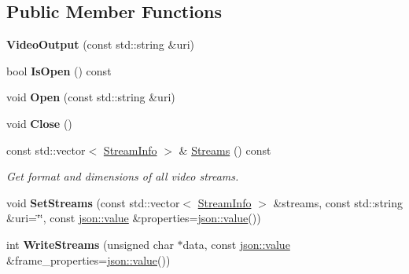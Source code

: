 \subsection*{Public Member Functions}
\begin{DoxyCompactItemize}
\item 
{\bfseries Video\+Output} (const std\+::string \&uri)\hypertarget{classpangolin_1_1_video_output_a05f21856f0889370d780ca0e5491ea47}{}\label{classpangolin_1_1_video_output_a05f21856f0889370d780ca0e5491ea47}

\item 
bool {\bfseries Is\+Open} () const \hypertarget{classpangolin_1_1_video_output_a4ad8612501aecd51d1caa98c3515d874}{}\label{classpangolin_1_1_video_output_a4ad8612501aecd51d1caa98c3515d874}

\item 
void {\bfseries Open} (const std\+::string \&uri)\hypertarget{classpangolin_1_1_video_output_ad1727d79393c51bfd72b75dc3937d1f4}{}\label{classpangolin_1_1_video_output_ad1727d79393c51bfd72b75dc3937d1f4}

\item 
void {\bfseries Close} ()\hypertarget{classpangolin_1_1_video_output_ab801c9900c515a5cb2d9fc0ffba6ea89}{}\label{classpangolin_1_1_video_output_ab801c9900c515a5cb2d9fc0ffba6ea89}

\item 
const std\+::vector$<$ \hyperlink{classpangolin_1_1_stream_info}{Stream\+Info} $>$ \& \hyperlink{classpangolin_1_1_video_output_abe468e7219ecd20dbfd65f1d4b03ca4c}{Streams} () const \hypertarget{classpangolin_1_1_video_output_abe468e7219ecd20dbfd65f1d4b03ca4c}{}\label{classpangolin_1_1_video_output_abe468e7219ecd20dbfd65f1d4b03ca4c}

\begin{DoxyCompactList}\small\item\em Get format and dimensions of all video streams. \end{DoxyCompactList}\item 
void {\bfseries Set\+Streams} (const std\+::vector$<$ \hyperlink{classpangolin_1_1_stream_info}{Stream\+Info} $>$ \&streams, const std\+::string \&uri=\char`\"{}\char`\"{}, const \hyperlink{classpangolin_1_1json_1_1value}{json\+::value} \&properties=\hyperlink{classpangolin_1_1json_1_1value}{json\+::value}())\hypertarget{classpangolin_1_1_video_output_a1378babb3b2661b36109c1a3dd6bec1e}{}\label{classpangolin_1_1_video_output_a1378babb3b2661b36109c1a3dd6bec1e}

\item 
int {\bfseries Write\+Streams} (unsigned char $\ast$data, const \hyperlink{classpangolin_1_1json_1_1value}{json\+::value} \&frame\+\_\+properties=\hyperlink{classpangolin_1_1json_1_1value}{json\+::value}())\hypertarget{classpangolin_1_1_video_output_a5554458300e9f542d5a4c06681c255a8}{}\label{classpangolin_1_1_video_output_a5554458300e9f542d5a4c06681c255a8}

\end{DoxyCompactItemize}
